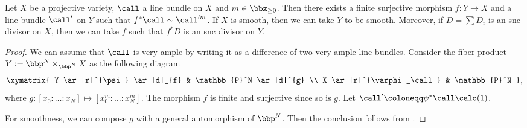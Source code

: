 
    \begin{lemma}\label{lem: divide a divisor by a finite surjective morphism}
        Let \(X\) be a projective variety, \(\call\) a line bundle on \(X\) and \(m \in \bbz_{\geq 0}\).
        Then there exists a finite surjective morphism \(f: Y \to X\) and a line bundle \(\call'\) on \(Y\) such that \(f^*\call \sim \call'^{m}\).
        If \(X\) is smooth, then we can take \(Y\) to be smooth.
        Moreover, if \(D = \sum D_i\) is an snc divisor on \(X\), then we can take \(f\) such that \(f^*D\) is an snc divisor on \(Y\).
    \end{lemma}
    \begin{proof}
        We can assume that \(\call\) is very ample by writing it as a difference of two very ample line bundles.
        Consider the fiber product \(Y:= \bbp^N \times_{\bbp^N} X\) as the following diagram
        \[ \xymatrix{
            Y \ar[r]^{\psi} \ar[d]_{f} & \mathbb{P}^N \ar[d]^{g} \\
            X \ar[r]^{\varphi_\call} & \mathbb{P}^N
        }, \]
        where \(g: [x_0: \ldots: x_N] \mapsto [x_0^m: \ldots: x_N^m]\).
        The morphism \(f\) is finite and surjective since so is \(g\).
        Let \(\call'\coloneqq \psi^*\call\calo(1)\).

        For smoothness, we can compose \(g\) with a general automorphism of \(\bbp^N\).
        Then the conclusion follows from \cite[Chapter III, Theorem 10.8]{Har77}.
    \end{proof}



